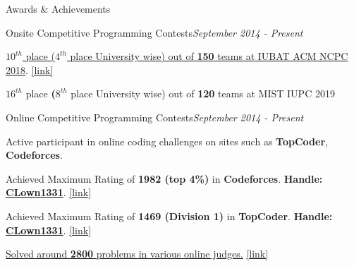 \documentclass{resume}
\begin{document}

\begin{rSection}{Awards \& Achievements} 

\begin{rSubsection}{Onsite Competitive Programming Contests}{\em September 2014 - Present}{}{}{}
\item \href{https://icpc.baylor.edu/ICPCID/DII3NHEO8O8I}{\textbf{$10^{th}$} place (\textbf{$4^{th}$} place University wise) out of \textbf{150} teams at IUBAT ACM NCPC 2018}. \href{https://icpc.baylor.edu/ICPCID/DII3NHEO8O8I}{[link]}
\item \textbf{$16^{th}$} place \textbf(\textbf{$8^{th}$} place University wise) out of \textbf{120} teams at MIST IUPC 2019
\end{rSubsection}

\begin{rSubsection}{Online Competitive Programming Contests}{\em September 2014 - Present}{}{}{}
\item Active participant in online coding challenges on sites such as \textbf{TopCoder}, \textbf{Codeforces}.
\item Achieved Maximum Rating of \textbf{1982 (top 4\%)} in \textbf{Codeforces}. \textbf{Handle:} \textbf{\href{http://codeforces.com/profile/CLown1331}{CLown1331}}. \href{http://codeforces.com/profile/CLown1331}{[link]}
\item Achieved Maximum Rating of \textbf{1469 (Division 1)} in \textbf{TopCoder}. \textbf{Handle:} \textbf{\href{https://www.topcoder.com/members/CLown1331/}{CLown1331}}. \href{https://www.topcoder.com/members/CLown1331/}{[link]}
\item \href{https://www.stopstalk.com/user/profile/clown1331}{Solved around \textbf{2800} problems in various online judges.} \href{https://www.stopstalk.com/user/profile/clown1331}{[link]}
\end{rSubsection}

\end{rSection}
\end{document}
